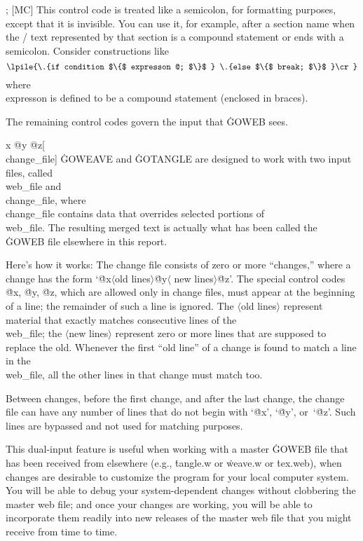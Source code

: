 \@; [MC] This control code is treated like a semicolon, for formatting
purposes, except that it is invisible. You can use it, for example, after
a section name when the \GO/ text represented by that section
is a compound statement or ends
with a semicolon. Consider constructions like
$$\lpile{\.{if condition $\{$ expresson @; $\}$  } 
\.{else $\{$ break; $\}$ }\cr}$$
where \\{expresson} is defined to be a compound statement (enclosed in braces).

\subsec
The remaining control codes govern the input that \.{GOWEB} sees.

\@{x @y @z}[\\{change\_file}]
\.{GOWEAVE} and \.{GOTANGLE} are designed to work with two input files,
called \\{web\_file} and \\{change\_file}, where \\{change\_file} contains
data that overrides selected portions of \\{web\_file}. The resulting merged
text is actually what has been called the \.{GOWEB} file elsewhere in this
report.

\more Here's how it works: The change file consists of zero or more ``changes,''
where a change has the form `\.{@x}$\langle$old lines$\rangle$\.{@y}$\langle$%
new lines$\rangle$\.{@z}'. The special control codes \.{@x}, \.{@y}, \.{@z},
which are allowed only in change files, must appear at the beginning of a line;
the remainder of such a line is ignored.
The $\langle$old lines$\rangle$ represent material that exactly matches
consecutive lines of the \\{web\_file}; the $\langle$new lines$\rangle$
represent zero or more lines that are supposed to replace the old. Whenever
the first ``old line'' of a change is found to match a line in the
\\{web\_file}, all the other lines in that change must match too.

\more Between changes, before the first change, and after the last change,
the change file can have any number of lines that do not begin with
`\.{@x}', `\.{@y}', or~`\.{@z}'. Such lines are bypassed and not used for
matching purposes.

\more This dual-input feature is useful when working with a master \.{GOWEB}
file that has been received from elsewhere (e.g., \.{tangle.w} or
\.{weave.w} or \.{tex.web}), when changes are desirable to customize the
program for your local computer system. You will be able to debug your
system-dependent changes without clobbering the master web file; and once
your changes are working, you will be able to incorporate them readily
into new releases of the master web file that you might receive from time
to time.

